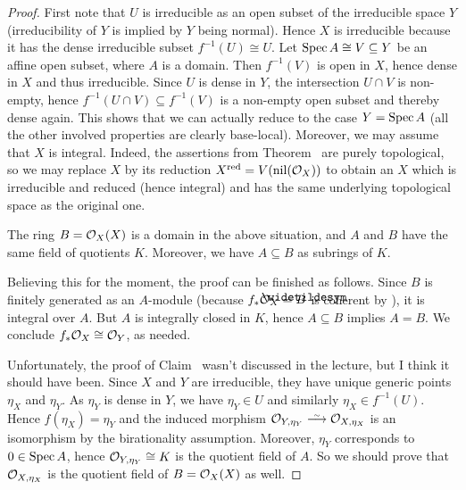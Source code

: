 \documentclass[a4paper,parskip=half,numbers=enddot, DIV=12]{scrreprt}
\begin{document}
\begin{proof}
	First note that $U$ is irreducible as an open subset of the irreducible space $Y$ (irreducibility of $Y$ is implied by $Y$ being normal). Hence $X$ is irreducible because it has the dense irreducible subset $f^{-1}(U)\cong U$. Let $\operatorname{Spec} A\cong V\subseteq Y$ be an affine open subset, where $A$ is a domain. Then $f^{-1}(V)$ is open in $X$, hence dense in $X$ and thus irreducible. Since $U$ is dense in $Y$, the intersection $U\cap V$ is non-empty, hence $f^{-1}(U\cap V)\subseteq f^{-1}(V)$ is a non-empty open subset and thereby dense again. This shows that we can actually reduce to the case $Y=\operatorname{Spec} A$ (all the other involved properties are clearly base-local). Moreover, we may assume that $X$ is integral. Indeed, the assertions from Theorem~ are purely topological, so we may replace $X$ by its reduction $X^{\mathrm{red}}=V(\operatorname{nil}(\mathcal{O}_X))$ to obtain an $X$ which is irreducible and reduced (hence integral) and has the same underlying topological space as the original one.
	\begin{claim}
		The ring $B=\mathcal{O}_X(X)$ is a domain in the above situation, and $A$ and $B$ have the same field of quotients $K$. Moreover, we have $A\subseteq B$ as subrings of $K$.
	\end{claim}
	Believing this for the moment, the proof can be finished as follows. Since $B$ is finitely generated as an $A$-module (because $f_*\Oo_X=\snake{B}$ is coherent by \cite[Theorem~5]{alggeo2}), it is integral over $A$. But $A$ is integrally closed in $K$, hence $A\subseteq B$ implies $A=B$. We conclude $f_*\mathcal{O}_X\cong \mathcal{O}_Y$, as needed.
	
	Unfortunately, the proof of Claim~ wasn't discussed in the lecture, but I think it should have been. Since $X$ and $Y$ are irreducible, they have unique generic points $\eta_X$ and $\eta_Y$. As $\eta_Y$ is dense in $Y$, we have $\eta_Y\in U$ and similarly $\eta_X\in f^{-1}(U)$. Hence $f(\eta_X)=\eta_Y$ and the induced morphism $\Oo_{Y,\eta_Y}\isomorphism\Oo_{X,\eta_X}$ is an isomorphism by the birationality assumption. Moreover, $\eta_Y$ corresponds to $0\in\operatorname{Spec} A$, hence $\mathcal{O}_{Y,\eta_Y}\cong K$ is the quotient field of $A$. So we should prove that $\mathcal{O}_{X,\eta_X}$ is the quotient field of $B=\mathcal{O}_X(X)$ as well.
	

\end{proof}
\end{document}
